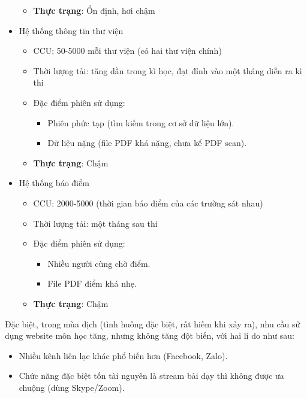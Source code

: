 \documentclass{article}
\begin{document}
\begin{itemize}
\begin{itemize}
            \item \textbf{Thực trạng}: Ổn định, hơi chậm
        \end{itemize}
    \item Hệ thống thông tin thư viện
        \begin{itemize}
            \item CCU: 50-5000 mỗi thư viện (có hai thư viện chính)
            \item Thời lượng tải: tăng dần trong kì học, đạt đỉnh vào một tháng
            diễn ra kì thi
            \item Đặc điểm phiên sử dụng:
                \begin{itemize}
                    \item Phiên phức tạp (tìm kiếm trong cơ sở dữ liệu lớn).
                    \item Dữ liệu nặng (file PDF khá nặng, chưa kể PDF scan).
                \end{itemize}
            \item \textbf{Thực trạng}: Chậm
        \end{itemize}
    \item Hệ thống báo điểm
        \begin{itemize}
            \item CCU: 2000-5000 (thời gian báo điểm của các trường sát nhau)
            \item Thời lượng tải: một tháng sau thi
            \item Đặc điểm phiên sử dụng:
                \begin{itemize}
                    \item Nhiều người cùng chờ điểm.
                    \item File PDF điểm khá nhẹ.
                \end{itemize}
            \item \textbf{Thực trạng}: Chậm
        \end{itemize}
\end{itemize}

Đặc biệt, trong mùa dịch (tình huống đặc biệt, rất hiếm khi xảy ra), nhu cầu sử
dụng website môn học tăng, nhưng không tăng đột biến, với hai lí do như sau:

\begin{itemize}
    \item Nhiều kênh liên lạc khác phổ biến hơn (Facebook, Zalo).
    \item Chức năng đặc biệt tốn tài nguyên là stream bài dạy thì không được ưa
    chuộng (dùng Skype/Zoom).
\end{itemize}
\end{document}
